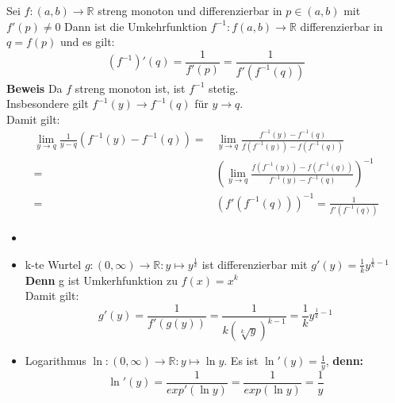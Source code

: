 \begin{Proposition}{
	Sei $f: \left(a,b\right) \rightarrow \mathbb{R}$ streng monoton und 
	differenzierbar in $p \in \left(a, b\right)$ mit $f'\left(p\right) \neq 0$
	Dann ist die Umkehrfunktion $f^{-1}: f\left(a,b\right) \rightarrow \mathbb{R}$
	differenzierbar in $q = f(p)$ und es gilt: 
	\begin{equation*}
		\left( f^{-1}\right)'\left(q\right) = \frac{1}{f'(p)} =
		 \frac{1}{f'(f^{-1}(q))}
	\end{equation*}
	\textbf{Beweis} Da $f$ streng monoton ist, ist $f^{-1}$  stetig. \\
	Insbesondere gilt $f^{-1}(y) \rightarrow f^{-1}(q)$ für $y \rightarrow q$.\\
	Damit gilt:
	\begin{align*}		
	 \lim\limits_{y \rightarrow q}
		{\frac{1}{y-q} \left( f^{-1}(y) - f^{-1}(q) \right) }
		= & \lim\limits_{y \rightarrow q}
		{\frac{f^{-1}(y) - f^{-1}(q)}{f(f^{-1}(y)) - f(f^{-1}(q)) }} \\
		= &\left( \lim\limits_{y \rightarrow q}
		{\frac{f(f^{-1}(y)) - f(f^{-1}(q))}
		{f^{-1}(y) - f^{-1}(q)} } \right)^{-1} \\
		= & \left(f'(f^{-1}(q))\right)^{-1}
		=  \frac{1}{f'\left( f^{-1}(q) \right)}		
	\end{align*}
}\end{Proposition}

\begin{Beispiel}{
	\begin{itemize}
		\item[]
		\item k-te Wurtel $g: (0,\infty) \rightarrow \mathbb{R} : 
		y \mapsto y^{\frac{1}{k}}$ ist differenzierbar mit 
		$g'(y) = \frac{1}{k}y^{\frac{1}{k}-1}$
		\textbf{Denn} g ist Umkerhfunktion zu $f(x) = x^k$ \\
		Damit gilt: 
		\begin{equation*}g'(y) = \frac{1}{f'(g(y))} = \frac{1}{k(\sqrt[k]{y})^{k-1}}
		= \frac{1}{k}y^{\frac{1}{k} -1}
		\end{equation*}
		\item Logarithmus $\ln: (0,\infty) \rightarrow \mathbb{R}: 
		y \mapsto \ln y$. Es ist 
		$\ln'(y) = \frac{1}{y}$, \textbf{denn:}
		\begin{equation*}\ln'(y) = \frac{1}{exp'(\ln y)}
		= \frac{1}{exp(\ln y)} = \frac{1}{y}
		\end{equation*}
	\end{itemize}
}\end{Beispiel}

